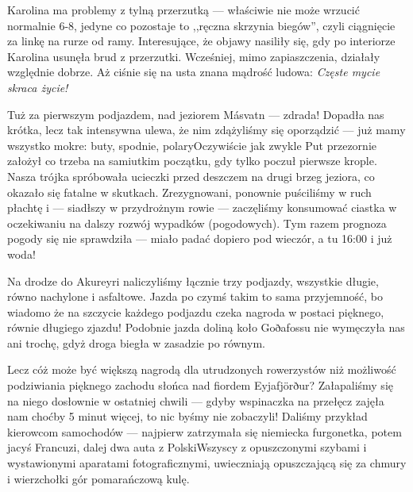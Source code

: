 
Karolina ma problemy z tylną przerzutką --- właściwie nie może wrzucić normalnie 6-8, jedyne co pozostaje to ,,ręczna skrzynia biegów'', czyli ciągnięcie za linkę na rurze od ramy. Interesujące, że objawy nasiliły się, gdy po interiorze Karolina usunęła brud z przerzutki. Wcześniej, mimo zapiaszczenia, działały względnie dobrze. Aż ciśnie się na usta znana mądrość ludowa: \emph{Częste mycie skraca życie!}

Tuż za pierwszym podjazdem, nad jeziorem Másvatn --- zdrada! Dopadła nas krótka, lecz tak intensywna ulewa, że nim zdążyliśmy się oporządzić --- już mamy wszystko mokre: buty, spodnie, polary\textellipsis Oczywiście jak zwykle Put przezornie założył co trzeba na samiutkim początku, gdy tylko poczuł pierwsze krople. Nasza trójka spróbowała ucieczki przed deszczem na drugi brzeg jeziora, co okazało się  fatalne w skutkach. Zrezygnowani, ponownie puściliśmy w ruch płachtę i --- siadłszy w przydrożnym rowie --- zaczęliśmy konsumować ciastka w oczekiwaniu na dalszy rozwój wypadków (pogodowych). Tym razem prognoza pogody się nie sprawdziła --- miało padać dopiero pod wieczór, a tu 16:00 i już woda!

Na drodze do Akureyri naliczyliśmy łącznie trzy podjazdy, wszystkie długie, równo nachylone i asfaltowe. Jazda po czymś takim to sama przyjemność, bo wiadomo że na szczycie każdego podjazdu czeka nagroda w postaci pięknego, równie długiego zjazdu! Podobnie jazda doliną koło Goðafossu nie wymęczyła nas ani trochę, gdyż droga biegła w zasadzie po równym.

Lecz cóż może być większą nagrodą dla utrudzonych rowerzystów niż możliwość podziwiania pięknego zachodu słońca nad fiordem Eyjafjörður? Załapaliśmy się na niego dosłownie w ostatniej chwili --- gdyby wspinaczka na przełęcz zajęła nam choćby 5 minut więcej, to nic byśmy nie zobaczyli! Daliśmy przykład kierowcom samochodów --- najpierw zatrzymała się niemiecka furgonetka, potem jacyś Francuzi, dalej dwa auta z Polski\textellipsis Wszyscy z opuszczonymi szybami i wystawionymi aparatami fotograficznymi, uwieczniają opuszczającą się za chmury i wierzchołki gór pomarańczową kulę.


